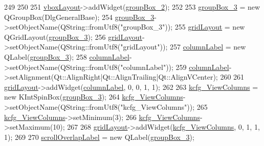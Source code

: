 \begin{DoxyCode}
249 
250 
251         \hyperlink{classUi__DlgGeneralBase_ad85268c43c0919c56230704be03f092c}{vboxLayout}->addWidget(\hyperlink{classUi__DlgGeneralBase_ae822e688fc0f616b4a29511bc5615a3d}{groupBox\_2});
252 
253         \hyperlink{classUi__DlgGeneralBase_a14484da34e83830a42cd4929ba2c7d86}{groupBox\_3} = \textcolor{keyword}{new} QGroupBox(DlgGeneralBase);
254         \hyperlink{classUi__DlgGeneralBase_a14484da34e83830a42cd4929ba2c7d86}{groupBox\_3}->setObjectName(QString::fromUtf8(\textcolor{stringliteral}{"groupBox\_3"}));
255         \hyperlink{classUi__DlgGeneralBase_ae149cf7331bb8bdd9c3f8dabdde003e4}{gridLayout} = \textcolor{keyword}{new} QGridLayout(\hyperlink{classUi__DlgGeneralBase_a14484da34e83830a42cd4929ba2c7d86}{groupBox\_3});
256         \hyperlink{classUi__DlgGeneralBase_ae149cf7331bb8bdd9c3f8dabdde003e4}{gridLayout}->setObjectName(QString::fromUtf8(\textcolor{stringliteral}{"gridLayout"}));
257         \hyperlink{classUi__DlgGeneralBase_ad6a70134bad0df0f344b5ec449ad9995}{columnLabel} = \textcolor{keyword}{new} QLabel(\hyperlink{classUi__DlgGeneralBase_a14484da34e83830a42cd4929ba2c7d86}{groupBox\_3});
258         \hyperlink{classUi__DlgGeneralBase_ad6a70134bad0df0f344b5ec449ad9995}{columnLabel}->setObjectName(QString::fromUtf8(\textcolor{stringliteral}{"columnLabel"}));
259         \hyperlink{classUi__DlgGeneralBase_ad6a70134bad0df0f344b5ec449ad9995}{columnLabel}->setAlignment(Qt::AlignRight|Qt::AlignTrailing|Qt::AlignVCenter);
260 
261         \hyperlink{classUi__DlgGeneralBase_ae149cf7331bb8bdd9c3f8dabdde003e4}{gridLayout}->addWidget(\hyperlink{classUi__DlgGeneralBase_ad6a70134bad0df0f344b5ec449ad9995}{columnLabel}, 0, 0, 1, 1);
262 
263         \hyperlink{classUi__DlgGeneralBase_a8951356ecfac9ee4a27ea0b2bca2e12e}{kcfg\_ViewColumns} = \textcolor{keyword}{new} KIntSpinBox(\hyperlink{classUi__DlgGeneralBase_a14484da34e83830a42cd4929ba2c7d86}{groupBox\_3});
264         \hyperlink{classUi__DlgGeneralBase_a8951356ecfac9ee4a27ea0b2bca2e12e}{kcfg\_ViewColumns}->setObjectName(QString::fromUtf8(\textcolor{stringliteral}{"kcfg\_ViewColumns"}));
265         \hyperlink{classUi__DlgGeneralBase_a8951356ecfac9ee4a27ea0b2bca2e12e}{kcfg\_ViewColumns}->setMinimum(3);
266         \hyperlink{classUi__DlgGeneralBase_a8951356ecfac9ee4a27ea0b2bca2e12e}{kcfg\_ViewColumns}->setMaximum(10);
267 
268         \hyperlink{classUi__DlgGeneralBase_ae149cf7331bb8bdd9c3f8dabdde003e4}{gridLayout}->addWidget(\hyperlink{classUi__DlgGeneralBase_a8951356ecfac9ee4a27ea0b2bca2e12e}{kcfg\_ViewColumns}, 0, 1, 1, 1);
269 
270         \hyperlink{classUi__DlgGeneralBase_afd8162f00985b598c6b44fea18d59add}{scrollOverlapLabel} = \textcolor{keyword}{new} QLabel(\hyperlink{classUi__DlgGeneralBase_a14484da34e83830a42cd4929ba2c7d86}{groupBox\_3});

\end{DoxyCode}
